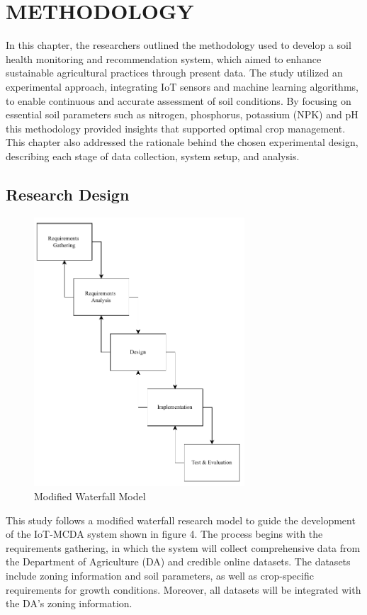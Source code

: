 \chapter{METHODOLOGY}
{\baselineskip
	
	In this chapter, the researchers outlined the methodology used to develop a soil health monitoring and recommendation system, which aimed to enhance sustainable agricultural practices through present data. The study utilized an experimental approach, integrating IoT sensors and machine learning algorithms, to enable continuous and accurate assessment of soil conditions. By focusing on essential soil parameters such as nitrogen, phosphorus, potassium (NPK) and pH this methodology provided insights that supported optimal crop management. This chapter also addressed the rationale behind the chosen experimental design, describing each stage of data collection, system setup, and analysis.
		
	\section{Research Design}
	\begin{figure}[H]
		\centering
		\caption{Modified Waterfall Model}
		\label{fig:ResearchDesign}
		\includegraphics[width=0.7\textwidth]{figures/ResearchDesign.pdf}
	\end{figure}
	
	This study follows a modified waterfall research model to guide the development of the IoT-MCDA system shown in figure 4. The process begins with the requirements gathering, in which the system will collect comprehensive data from the Department of Agriculture (DA) and credible online datasets. The datasets include zoning information and soil parameters, as well as crop-specific requirements for growth conditions. Moreover, all datasets will be integrated with the DA’s zoning information.
	 
}
